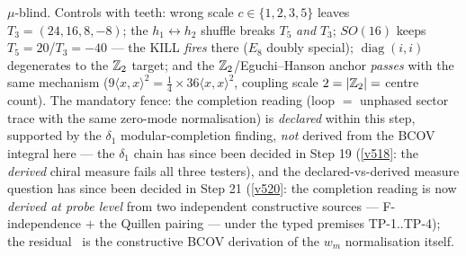 $\mu$-blind. Controls with teeth: wrong scale $c\in\{1,2,3,5\}$ leaves $T_3=(24,16,8,-8)$; the
$h_1{\leftrightarrow}h_2$ shuffle breaks $T_5$ \emph{and} $T_3$; $SO(16)$ keeps
$T_5=20$/$T_3=-40$ --- the KILL \emph{fires} there ($E_8$ doubly special);
$\operatorname{diag}(i,i)$ degenerates to the $\mathbb{Z}_2$ target; and the $\mathbb{Z}_2$/Eguchi--Hanson
anchor \emph{passes} with the same mechanism ($9\langle x,x\rangle^2=\tfrac14\times36\langle
x,x\rangle^2$, coupling scale $2=|\mathbb{Z}_2|=$ centre count). The mandatory fence: the completion
reading (loop $=$ unphased sector trace with the same zero-mode normalisation) is
\emph{declared} within this step, supported by the $\delta_1$ modular-completion finding,
\emph{not} derived from
the BCOV integral here --- the $\delta_1$ chain has since been decided in Step 19 (\vref{v518}: the
\emph{derived} chiral measure fails all three testers), and the declared-vs-derived measure
question has since been decided in Step 21 (\vref{v520}: the completion reading is now
\emph{derived at probe level} from two independent constructive sources --- F-independence $+$
the Quillen pairing --- under the typed premises TP-1..TP-4); the residual \mO\ is the
constructive BCOV derivation of the $w_m$ normalisation itself.

